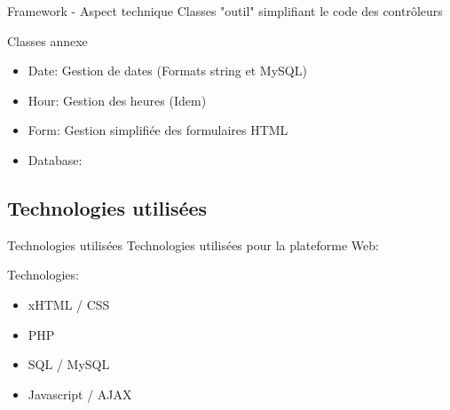 \begin{frame}{Framework - Aspect technique}
    Classes "outil" simplifiant le code des contrôleurs
    \begin{block}{Classes annexe}
    \begin{itemize}
    \item Date: Gestion de dates (Formats string et MySQL)
    \item Hour: Gestion des heures (Idem)
    \item Form: Gestion simplifiée des formulaires HTML
    \item Database: 
    \end{itemize}
    \end{block}
\end{frame}

\subsection{Technologies utilisées}
\begin{frame}{Technologies utilisées}
    Technologies utilisées pour la plateforme Web:
    \begin{block}{Technologies:}
    \begin{itemize}
    \item xHTML / CSS
    \item PHP
    \item SQL / MySQL
    \item Javascript / AJAX
    \end{itemize}
    \end{block}
\end{frame}
